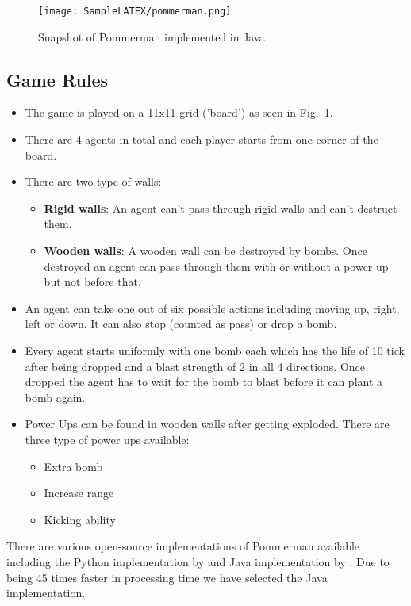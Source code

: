 \documentclass{llncs}
\begin{document}
\begin{figure}
    \centering
    \texttt{[image: SampleLATEX/pommerman.png]}
    \caption{Snapshot of Pommerman implemented in Java}
    \label{fig:pommerman}
\end{figure}

\subsection{Game Rules}

\begin{itemize}
    \item The game is played on a 11x11 grid ('board') as seen in Fig.~\ref{fig:pommerman}.
    \item There are 4 agents in total and each player starts from one corner of the board.
    \item There are two type of walls:
    \begin{itemize}
        \item \textbf{Rigid walls}: An agent can't pass through rigid walls and can't destruct them.
        \item \textbf{Wooden walls}: A wooden wall can be destroyed by bombs. Once destroyed an agent can pass through them with or without a power up but not before that. 
    \end{itemize}
    \item An agent can take one out of six possible actions including moving up, right, left or down. It can also stop (counted as pass) or drop a bomb.
    \item Every agent starts uniformly with one bomb each which has the life of 10 tick after being dropped and a blast strength of 2 in all 4 directions. Once dropped the agent has to wait for the bomb to blast before it can plant a bomb again.
    \item Power Ups can be found in wooden walls after getting exploded. There are three type of power ups available:
    \begin{itemize}
        \item Extra bomb
        \item Increase range
        \item Kicking ability
    \end{itemize}
\end{itemize}

\noindent
There are various open-source implementations of Pommerman available including the Python implementation by \cite{DBLP} and Java implementation by \cite{perez2019analysis}. Due to being 45 times faster \cite{perez2019analysis} in processing time we have selected the Java implementation.
\end{document}
